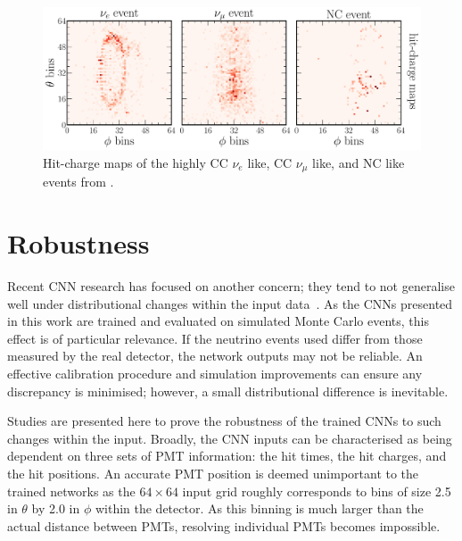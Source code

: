 \begin{figure} %
    \includegraphics[width=\textwidth]{diagrams/7-results/explain_beam_tsne_events.pdf}
    \caption[Hit-charge maps of highly CC $\nu_{e}$ like, CC $\nu_{\mu}$ like, and NC like events]
    {Hit-charge maps of the highly CC $\nu_{e}$ like, CC $\nu_{\mu}$ like, and NC like events from
        .}
    \label{fig:explain_beam_tsne_events}
\end{figure}

\section{Robustness} %
\label{sec:results_robust} %

Recent CNN research has focused on another concern; they tend to not generalise well under
distributional changes within the input data~\cite{djolonga2020}. As the CNNs presented in this
work are trained and evaluated on simulated Monte Carlo events, this effect is of particular
relevance. If the neutrino events used differ from those measured by the real \chipsfive detector,
the network outputs may not be reliable. An effective calibration procedure and simulation
improvements can ensure any discrepancy is minimised; however, a small distributional difference
is inevitable.

Studies are presented here to prove the robustness of the trained CNNs to such changes within the
input. Broadly, the CNN inputs can be characterised as being dependent on three sets of PMT
information: the hit times, the hit charges, and the hit positions. An accurate PMT position is
deemed unimportant to the trained networks as the $64 \times 64$ input grid roughly corresponds to
bins of size \SI{2.5}{} in $\theta$ by \SI{2.0}{} in $\phi$ within the \chipsfive
detector. As this binning is much larger than the actual distance between PMTs, resolving
individual PMTs becomes impossible.

